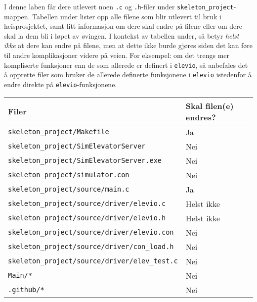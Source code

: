 \begin{alphasection}
I denne laben får dere utlevert noen \verb|.c| og \verb|.h|-filer under \verb|skeleton_project|-mappen. Tabellen under lister opp alle filene som blir utlevert til bruk i heisprosjektet, samt litt informasjon om dere skal endre på filene eller om dere skal la dem bli i løpet av øvingen. I kontekst av tabellen under, så betyr \textit{helst ikke} at dere kan endre på filene, men at dette ikke burde gjøres siden det kan føre til andre komplikasjoner videre på veien. For eksempel: om det trengs mer kompliserte funksjoner enn de som allerede er definert i \verb|elevio|, så anbefales det å opprette filer som bruker de allerede definerte funksjonene i \verb|elevio| istedenfor å endre direkte på \verb|elevio|-funksjonene.

\begin{center}
 \begin{tabular}{|p{8.5cm} p{5.5cm}|} 
 \hline
 Filer & Skal filen(e) endres?  \\ [0.5ex] 
 \hline\hline
  \verb|skeleton_project/Makefile| & \quad \quad \quad \quad Ja \\
 \hline
   \verb|skeleton_project/SimElevatorServer| & \quad \quad \quad \quad Nei \\
 \hline
   \verb|skeleton_project/SimElevatorServer.exe| & \quad \quad \quad \quad Nei \\
 \hline
   \verb|skeleton_project/simulator.con| & \quad \quad \quad \quad Nei \\
 \hline
  \verb|skeleton_project/source/main.c| & \quad \quad \quad \quad Ja  \\ 
 \hline
  \verb|skeleton_project/source/driver/elevio.c| &  \quad \quad \quad \quad Helst ikke \\ 
 \hline
 \verb|skeleton_project/source/driver/elevio.h| &  \quad \quad \quad \quad Helst ikke \\ 
 \hline
  \verb|skeleton_project/source/driver/elevio.con| &  \quad \quad \quad \quad Nei \\ 
 \hline
  \verb|skeleton_project/source/driver/con_load.h| &  \quad \quad \quad \quad Nei \\ 
 \hline
 \verb|skeleton_project/source/driver/elev_test.c| &  \quad \quad \quad \quad Nei \\
  \hline
 \verb|Main/*| & \quad \quad \quad \quad Nei  \\ 
 \hline
 \verb|.github/*| & \quad \quad \quad \quad Nei \\
 \hline 
\end{tabular}
\end{center}


\end{alphasection}
